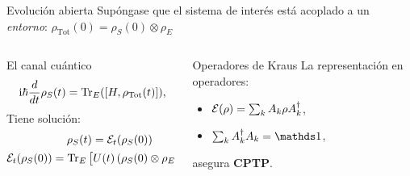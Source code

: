 \begin{frame}{Evolución abierta}
    Supóngase que el sistema de interés está acoplado a un \textit{entorno}: $\rho_{\text{Tot}}(0)=\rho_{S}(0)\otimes\rho_{E}$\pause
    \begin{columns}
        \begin{column}{0.5\textwidth}
            \begin{block}{El canal cuántico}
            \begin{align}
                \rmi\hbar\frac{d}{d t} \rho_{S}(t)=\Tr_{E}([H,\rho_{\text{Tot}}(t)])\rlap{,}\nonumber
            \end{align}\pause
            Tiene solución:
            \begin{equation}
                \begin{gathered}
                \rho_{S}(t)=\mathcal{E}_{t}(\rho_{S}(0))\\
                \mathcal{E}_{t}(\rho_{S}(0))=\Tr_{E}\qty[U(t)\left(\rho_{S}(0)\otimes\rho_{E}\right)U^{\dag}(t)]
            \end{gathered}\nonumber
            \end{equation}
            \end{block}
        \end{column}
        \pause
        \begin{column}{0.5\textwidth}
            \begin{block}{Operadores de Kraus}
                \vspace{0.5cm}
                La representación en operadores:
                \vspace{0.3cm}
            \begin{itemize}
                \item $\mathcal{E}(\rho)=\sum_{k}A_{k}\rho A^{\dagger}_{k}$,\pause
                \item $\sum_{k}A_{k}^{\dagger}A_{k}=\Id$,\pause
            \end{itemize}
            \vspace{0.3cm}
            asegura \textbf{CPTP}.
            \vspace{0.5cm}
        \end{block}
        \end{column}
    \end{columns}
\end{frame}



